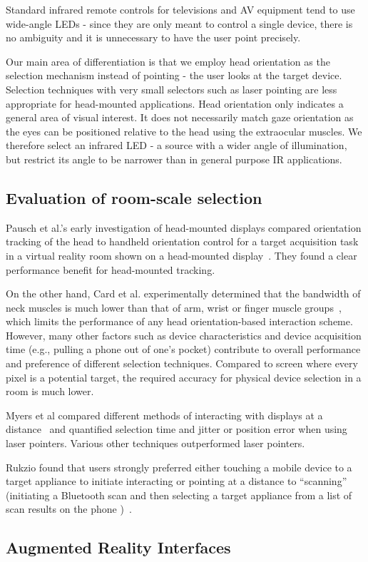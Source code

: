 Standard infrared remote controls for televisions and AV equipment tend to use wide-angle LEDs - since they are only meant to control a single device, there is no ambiguity  and it is unnecessary to have the user point precisely.

Our main area of differentiation is that we employ head orientation as the selection mechanism instead of pointing - the user looks at the target device. Selection techniques with very small selectors such as laser pointing are less appropriate for head-mounted applications. Head orientation only indicates a general area of visual interest. It does not necessarily match gaze orientation as the eyes can be positioned relative to the head using the extraocular muscles. We therefore select an infrared LED - a source with a wider angle of illumination, but restrict its angle to be narrower than in general purpose IR applications.



\subsection{Evaluation of room-scale selection}
Pausch et al.'s early investigation of head-mounted displays compared orientation tracking of the head to handheld orientation control for a target acquisition task in a virtual reality room shown on a head-mounted display~\cite{pausch_user_1993}. They found a clear performance benefit for head-mounted tracking.

On the other hand, Card et al. experimentally determined that the bandwidth of neck muscles is much lower than that of arm, wrist or finger muscle groups~\cite{card_morphological_1991}, which limits the performance of any head orientation-based interaction scheme. However, many other factors such as device characteristics and device acquisition time (e.g., pulling a phone out of one's pocket) contribute to overall performance and preference of different selection techniques. Compared to screen where every pixel is a potential target, the required accuracy for physical device selection in a room is much lower.

Myers et al compared different methods of interacting with displays at a distance~\cite{myers_interacting_2002} and quantified selection time and jitter or position error when using laser pointers. Various other techniques outperformed laser pointers.

Rukzio found that users strongly preferred either touching a mobile device to a target appliance to initiate interacting or pointing at a distance to ``scanning'' (initiating a Bluetooth scan and then selecting a target appliance from a list of scan results on the phone )~\cite{rukzio_experimental_2006}.

\subsection{Augmented Reality Interfaces}
